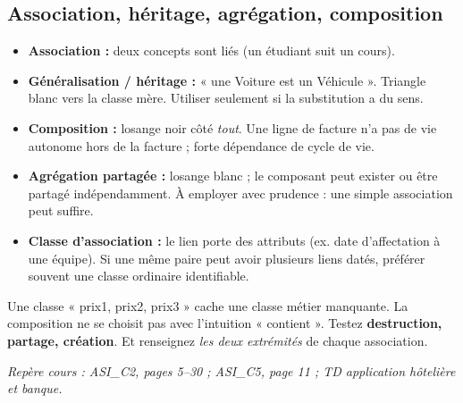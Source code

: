 \documentclass[10pt,a4paper]{article}
\newcommand{\source}[1]{\par{\footnotesize\color{bodygray}\textit{Repère cours : #1}}}
\begin{document}
\subsection{Association, héritage, agrégation, composition}
\begin{itemize}
\item \textbf{Association :} deux concepts sont liés (un étudiant suit un cours).
\item \textbf{Généralisation / héritage :} « une Voiture est un Véhicule ». Triangle blanc vers la classe mère. Utiliser seulement si la substitution a du sens.
\item \textbf{Composition :} losange noir côté \emph{tout}. Une ligne de facture n'a pas de vie autonome hors de la facture ; forte dépendance de cycle de vie.
\item \textbf{Agrégation partagée :} losange blanc ; le composant peut exister ou être partagé indépendamment. À employer avec prudence : une simple association peut suffire.
\item \textbf{Classe d'association :} le lien porte des attributs (ex. date d'affectation à une équipe). Si une même paire peut avoir plusieurs liens datés, préférer souvent une classe ordinaire identifiable.
\end{itemize}
\begin{center}
\end{center}
\begin{warningbox}
Une classe « prix1, prix2, prix3 » cache une classe métier manquante. La composition ne se choisit pas avec l'intuition « contient ». Testez \textbf{destruction, partage, création}. Et renseignez \emph{les deux extrémités} de chaque association.
\end{warningbox}
\source{ASI\_C2, pages 5--30 ; ASI\_C5, page 11 ; TD application hôtelière et banque.}
\end{document}
